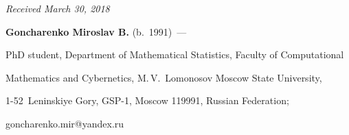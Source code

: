 \hfill{\small\textit{Received March 30, 2018}} 











\Contrl





\noindent


\textbf{Goncharenko Miroslav B.} (b.\ 1991)~--- 


PhD student, Department of Mathematical Statistics, Faculty of Computational 


Mathematics and Cybernetics, M.\,V.~Lomonosov Moscow State University, 


1-52~Leninskiye Gory, GSP-1, Moscow 119991, Russian Federation; 


\mbox{goncharenko.mir@yandex.ru}


\label{end\stat}








\renewcommand{\bibname}{\protect\rm Литература}


